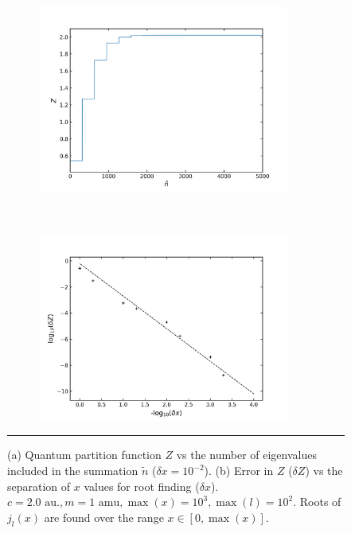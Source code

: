 \documentclass[../main.tex]{subfiles}
\begin{document}
\begin{figure}[h!]
	\begin{subfigure}[t]{0.5\textwidth}
		\centering
		\includegraphics[height=6.2cm]{4/figs/spherical_well_eigenvalue_sum_z_vs_tilde_n}
		\caption{}
	\end{subfigure}%
	~ 
	\begin{subfigure}[t]{0.5\textwidth}
		\centering
		\includegraphics[height=6.2cm]{4/figs/spherical_well_eigenvalue_sum_delta_x_vs_delta_z}
		\caption{}
	\end{subfigure}
	\vspace{0.2cm}
	\hrule
	\caption{(a) Quantum partition function $Z$ vs the number of eigenvalues included in the summation $\tilde{n}$ ($\delta x = 10^{-2}$). (b) Error in $Z$ ($\delta Z$) vs the separation of $x$ values for root finding ($\delta x$). $c = 2.0 \text{ au.}, m = 1 \text{ amu}, \max(x) = 10^3, \max(l) = 10^2$. Roots of $j_l(x)$ are found over the range $x \in [0, \max(x)]$.} 
	\label{spherical_well_eigenvalue_sum_2au_1882amu}
\end{figure}
\fi
\end{document}
